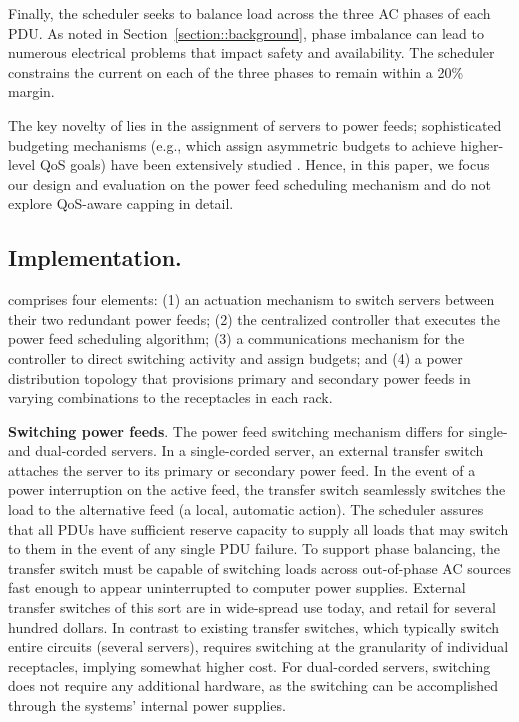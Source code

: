 Finally, the \PowerRouting scheduler seeks to balance load across the three AC phases of each PDU.  As noted in Section~\ref{section::background}, phase imbalance can lead to numerous electrical problems that impact safety and availability.  The scheduler constrains the current on each of the three phases to remain within a 20\% margin.

The key novelty of \PowerRouting lies in the assignment of servers to power feeds; sophisticated budgeting mechanisms (e.g., which assign asymmetric budgets to achieve higher-level QoS goals) have been extensively studied \cite{Ranganathan06,Lefurgy08,Wang08, Femal05,Raghavendra08,Wang09,Nathuji07,Gandhi09b}.  Hence, in this paper, we focus our design and evaluation on the power feed scheduling mechanism and do not explore QoS-aware capping in detail.

\subsection{Implementation.}

\PowerRouting comprises four elements: (1) an actuation mechanism to switch servers between their two redundant power feeds; (2) the centralized controller that executes the power feed scheduling algorithm;  (3) a communications mechanism for the controller to direct switching activity and assign budgets; and (4) a power distribution topology that provisions primary and secondary power feeds in varying combinations to the receptacles in each rack.   

\textbf{Switching power feeds}. The power feed switching mechanism differs for single- and dual-corded servers.  In a single-corded server, an external transfer switch attaches the server to its primary or secondary power feed.  In the event of a power interruption on the active feed, the transfer switch seamlessly switches the load to the alternative feed (a local, automatic action).  The scheduler assures that all PDUs have sufficient reserve capacity to supply all loads that may switch to them in the event of any single PDU failure.  To support phase balancing, the transfer switch must be capable of switching loads across out-of-phase AC sources fast enough to appear uninterrupted to computer power supplies.  External transfer switches of this sort are in wide-spread use today, and retail for several hundred dollars. In contrast to existing transfer switches, which typically switch entire circuits (several servers), \PowerRouting requires switching at the granularity of individual receptacles, implying somewhat higher cost. For dual-corded servers, switching does not require any additional hardware, as the switching can be accomplished through the systems' internal power supplies. 

